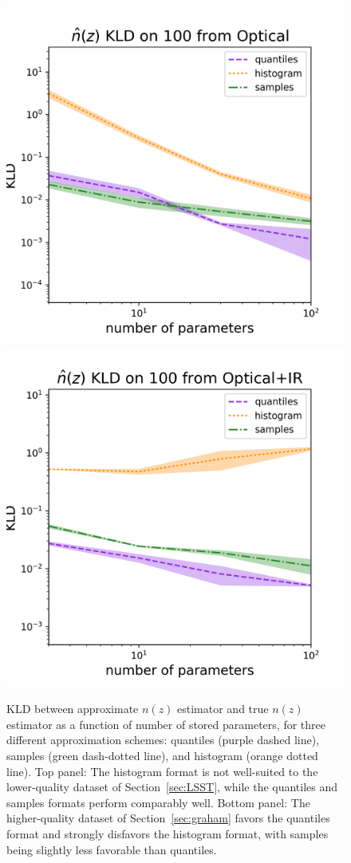 \documentclass[\docopts]{\docclass}
\begin{document}
\begin{figure}
  \includegraphics[width=0.9\columnwidth]{figures/lsst_kld.png}\\
  \includegraphics[width=0.9\columnwidth]{figures/graham_kld.png}
  \caption{KLD between approximate $n(z)$ estimator and true $n(z)$ estimator as a function of number of stored
parameters, for three different approximation schemes: quantiles (purple dashed line), samples (green dash-dotted
line), and histogram (orange dotted line).  Top panel: The histogram
format is not well-suited to the lower-quality dataset of Section~\ref{sec:LSST},
while the quantiles and samples formats perform comparably well.  Bottom panel: The
higher-quality dataset of Section~\ref{sec:graham} favors the quantiles format and
strongly disfavors the histogram format, with samples being slightly less
favorable than quantiles.
  \label{fig:kld}}
\end{figure}
\end{document}
